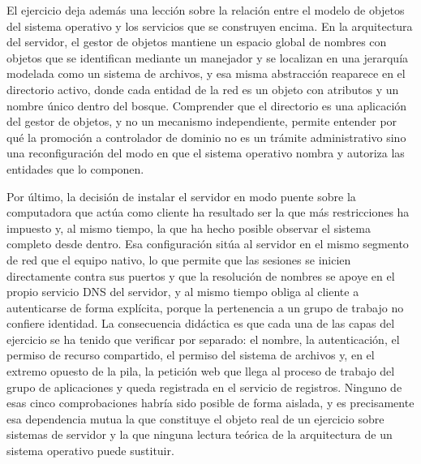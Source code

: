 \documentclass[12pt]{article}
\begin{document}
El ejercicio deja además una lección sobre la relación entre el modelo de objetos del sistema operativo y los servicios que se construyen encima. En la arquitectura del servidor, el gestor de objetos mantiene un espacio global de nombres con objetos que se identifican mediante un manejador y se localizan en una jerarquía modelada como un sistema de archivos, y esa misma abstracción reaparece en el directorio activo, donde cada entidad de la red es un objeto con atributos y un nombre único dentro del bosque. Comprender que el directorio es una aplicación del gestor de objetos, y no un mecanismo independiente, permite entender por qué la promoción a controlador de dominio no es un trámite administrativo sino una reconfiguración del modo en que el sistema operativo nombra y autoriza las entidades que lo componen.

Por último, la decisión de instalar el servidor en modo puente sobre la computadora que actúa como cliente ha resultado ser la que más restricciones ha impuesto y, al mismo tiempo, la que ha hecho posible observar el sistema completo desde dentro. Esa configuración sitúa al servidor en el mismo segmento de red que el equipo nativo, lo que permite que las sesiones se inicien directamente contra sus puertos y que la resolución de nombres se apoye en el propio servicio DNS del servidor, y al mismo tiempo obliga al cliente a autenticarse de forma explícita, porque la pertenencia a un grupo de trabajo no confiere identidad. La consecuencia didáctica es que cada una de las capas del ejercicio se ha tenido que verificar por separado: el nombre, la autenticación, el permiso de recurso compartido, el permiso del sistema de archivos y, en el extremo opuesto de la pila, la petición web que llega al proceso de trabajo del grupo de aplicaciones y queda registrada en el servicio de registros. Ninguno de esas cinco comprobaciones habría sido posible de forma aislada, y es precisamente esa dependencia mutua la que constituye el objeto real de un ejercicio sobre sistemas de servidor y la que ninguna lectura teórica de la arquitectura de un sistema operativo puede sustituir.
\end{document}
